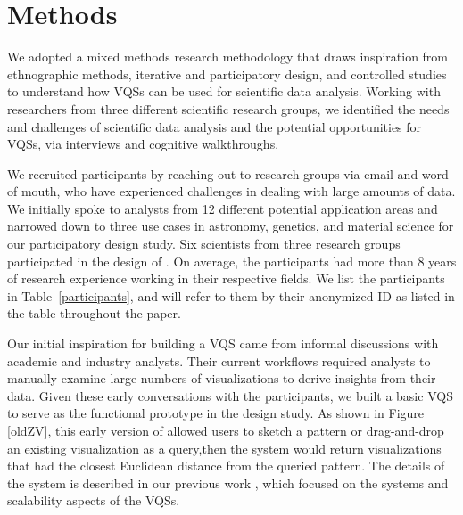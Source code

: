 \section{Methods\label{sec:methods}} 
\par We adopted a mixed methods research methodology that draws inspiration from ethnographic methods, iterative and participatory design, and controlled studies~\cite{miller_salkind_miller_2002,shneiderman2006strategies,Muller1993} to understand how VQSs can be used for scientific data analysis. Working with researchers from three different scientific research groups, we identified the needs and challenges of scientific data analysis and the potential opportunities for VQSs, via interviews and cognitive walkthroughs. 
\par We recruited participants by reaching out to research groups via email and word of mouth, who have experienced challenges in dealing with large amounts of data. We initially spoke to analysts from 12 different potential application areas and narrowed down to three use cases in astronomy, genetics, and material science for our participatory design study. Six scientists from three research groups participated in the design of \zv. On average, the participants had more than 8 years of research experience working in their respective fields. We list the participants in Table~\ref{participants}, and will refer to them by their anonymized ID as listed in the table throughout the paper. 
\par Our initial inspiration for building a VQS came from informal discussions with academic and industry analysts. Their current workflows required analysts to manually examine large numbers of visualizations to derive insights from their data. Given these early conversations with the participants, we built a basic VQS to serve as the functional prototype in the design study. As shown in Figure \ref{oldZV}, this early version of \zv allowed users to sketch a pattern or drag-and-drop an existing visualization as a query,then the system would return visualizations that had the closest Euclidean distance from the queried pattern. The details of the system is described in our previous work \cite{Siddiqui2017,Siddiqui2017VLDB}, which focused on the systems and scalability aspects of the VQSs.
